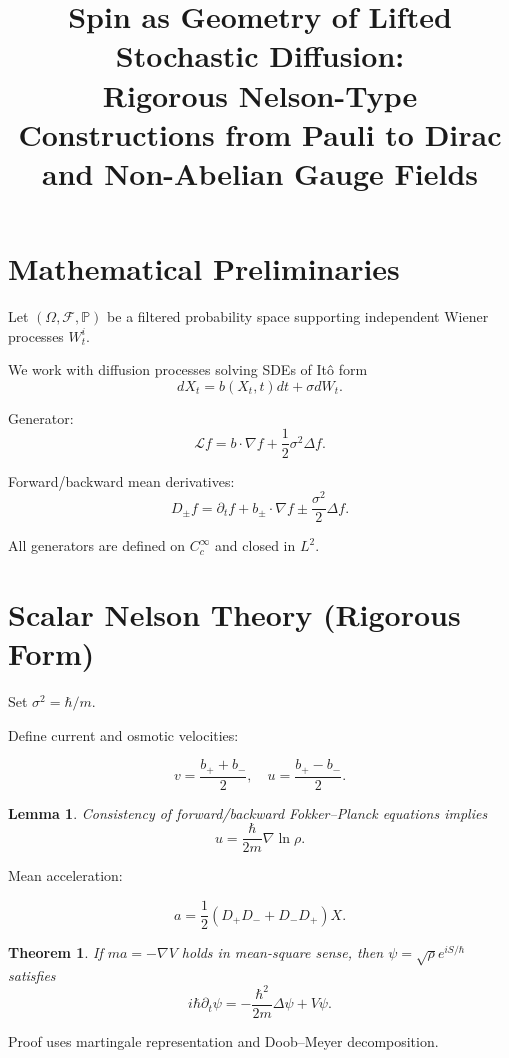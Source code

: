 \documentclass[11pt]{article}
\title{Spin as Geometry of Lifted Stochastic Diffusion:\\
Rigorous Nelson-Type Constructions from Pauli to Dirac\\
and Non-Abelian Gauge Fields}
\author{}
\date{}
\newtheorem{theorem}{Theorem}
\newtheorem{lemma}{Lemma}
\begin{document}
\maketitle
\tableofcontents

\section{Mathematical Preliminaries}

Let $(\Omega,\mathcal{F},\mathbb{P})$ be a filtered probability space
supporting independent Wiener processes $W^i_t$.

We work with diffusion processes solving SDEs of It\^o form
\[
dX_t = b(X_t,t)dt + \sigma dW_t.
\]

Generator:
\[
\mathcal{L}f = b\cdot\nabla f + \frac12\sigma^2 \Delta f.
\]

Forward/backward mean derivatives:
\[
D_\pm f = \partial_t f + b_\pm\cdot\nabla f
\pm \frac{\sigma^2}{2}\Delta f.
\]

All generators are defined on $C_c^\infty$ and closed in $L^2$.

\section{Scalar Nelson Theory (Rigorous Form)}

Set $\sigma^2 = \hbar/m$.

Define current and osmotic velocities:

\[
v = \frac{b_+ + b_-}{2},
\quad
u = \frac{b_+ - b_-}{2}.
\]

\begin{lemma}
Consistency of forward/backward Fokker–Planck equations implies
\[
u = \frac{\hbar}{2m}\nabla\ln\rho.
\]
\end{lemma}

Mean acceleration:

\[
a = \frac12(D_+D_- + D_-D_+)X.
\]

\begin{theorem}
If $ma=-\nabla V$ holds in mean-square sense,
then $\psi=\sqrt{\rho}e^{iS/\hbar}$ satisfies
\[
i\hbar\partial_t\psi
=
-\frac{\hbar^2}{2m}\Delta\psi + V\psi.
\]
\end{theorem}

Proof uses martingale representation and Doob–Meyer decomposition.

\end{document}
